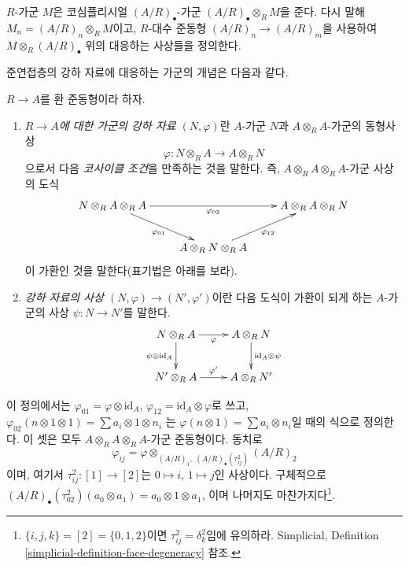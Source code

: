 \medskip\noindent
$R$-가군 $M$은 코심플리시얼 $(A/R)_\bullet$-가군
$(A/R)_\bullet \otimes_R M$을 준다. 다시 말해
$M_n = (A/R)_n \otimes_R M$이고, $R$-대수 준동형
$(A/R)_n \to (A/R)_m$을 사용하여
$M \otimes_R (A/R)_\bullet$ 위의 대응하는 사상들을 정의한다.

\medskip\noindent
준연접층의 강하 자료에 대응하는 가군의 개념은 다음과 같다.

\begin{definition}
\label{definition-descent-datum-modules}
$R \to A$를 환 준동형이라 하자.
\begin{enumerate}
\item {\it $R \to A$에 대한 가군의 강하 자료 $(N, \varphi)$}란
$A$-가군 $N$과 $A \otimes_R A$-가군의 동형사상
$$
\varphi : N \otimes_R A \to A \otimes_R N
$$
으로서 다음 {\it 코사이클 조건}을 만족하는 것을 말한다. 즉,
$A \otimes_R A \otimes_R A$-가군 사상의 도식
$$
\xymatrix{
N \otimes_R A \otimes_R A \ar[rr]_{\varphi_{02}}
\ar[rd]_{\varphi_{01}}
& &
A \otimes_R A \otimes_R N \\
& A \otimes_R N \otimes_R A \ar[ru]_{\varphi_{12}} &
}
$$
이 가환인 것을 말한다(표기법은 아래를 보라).
\item {\it 강하 자료의 사상 $(N, \varphi) \to (N', \varphi')$}이란
다음 도식이 가환이 되게 하는 $A$-가군의 사상 $\psi : N \to N'$를 말한다.
$$
\xymatrix{
N \otimes_R A \ar[r]_\varphi \ar[d]_{\psi \otimes \text{id}_A} &
A \otimes_R N \ar[d]^{\text{id}_A \otimes \psi} \\
N' \otimes_R A \ar[r]^{\varphi'} &
A \otimes_R N'
}
$$
\end{enumerate}
\end{definition}

\noindent
이 정의에서는
$\varphi_{01} = \varphi \otimes \text{id}_A$,
$\varphi_{12} = \text{id}_A \otimes \varphi$로 쓰고,
$\varphi_{02}(n \otimes 1 \otimes 1) = \sum a_i \otimes 1 \otimes n_i$
는 $\varphi(n \otimes 1) = \sum a_i \otimes n_i$일 때의 식으로 정의한다.
이 셋은 모두 $A \otimes_R A \otimes_R A$-가군 준동형이다. 동치로
$$
\varphi_{ij}
=
\varphi \otimes_{(A/R)_1, \ (A/R)_\bullet(\tau^2_{ij})} (A/R)_2
$$
이며, 여기서 $\tau^2_{ij} : [1] \to [2]$는
$0 \mapsto i$, $1 \mapsto j$인 사상이다. 구체적으로
$(A/R)_{\bullet}(\tau^2_{02})(a_0 \otimes a_1) =
a_0 \otimes 1 \otimes a_1$,
이며 나머지도 마찬가지다\footnote{$\{i, j, k\} = [2] = \{0, 1, 2\}$이면
$\tau^2_{ij} = \delta^2_k$임에 유의하라. Simplicial, Definition
\ref{simplicial-definition-face-degeneracy} 참조.}.

